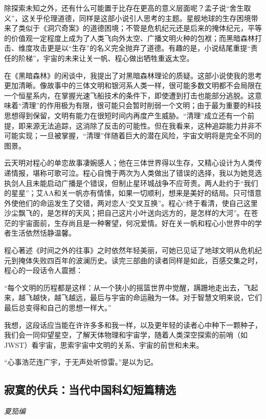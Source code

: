 \par 除探索未知之外，还有什么可能置于比存在更高的意义层面呢？孟子说“舍生取义”，这关乎伦理道德，同样是这部小说引人思考的主题。星舰地球的生存困境带来了类似于《洞穴奇案》的道德困境；不管是危机纪元还是后来的掩体纪元，平等的价值观一定程度上成为了人类飞向外太空、广播文明火种的包袱；而黑暗森林打击、维度攻击更是以“生存”的名义完全抛弃了道德。有趣的是，小说结尾重提“责任的阶梯”，宇宙的未来让关一帆、程心做出牺牲重返太空。
\par 在《黑暗森林》的闲谈中，我提出了对黑暗森林理论的质疑。这部小说使我的思考更加清晰。像故事中的三体文明和银河系人类一样，很可能多数文明都不会局限在一个恒星系内，在掌握光速飞船技术的条件下，即使遭到打击也能部分逃脱。这意味着“清理”的作用极为有限，很可能只会暂时削弱一个文明；由于最为重要的科技思想得到保留，文明有能力在很短时间内再度产生威胁。“清理”成立还有一个前提，即来源无法追踪，这消除了反击的可能性。但在我看来，这种追踪能力并非不可能实现；一旦被掌握，“清理”伴随着巨大的潜在风险，宇宙文明将是完全不同的图景。
\par 云天明对程心的单恋故事凄婉感人；他在三体世界得以生存，又精心设计为人类传递情报，堪称可歌可泣。程心自愧于两次为人类做出了错误的选择，我以为她竞选执剑人且未能启动广播是个错误，但制止星环城战争不应苛责。两人赴约于“我们的星星”；艾AA和关一帆亦有情愫，如果一切顺利，想来是美好的结局。只可惜意外使他们的命运发生了交错，两对恋人“交叉互换”。程心“终于看清，使自己这里沙尘飘飞的，是怎样的天风；把自己这片小叶送向远方的，是怎样的大河”。在苍茫的宇宙面前，生存尚且是一种奢望，何况爱情。好在关一帆和程心小世界中的学者生活依然恬静温馨。
\par 程心著述《时间之外的往事》之时依然年轻美丽，可她已见证了地球文明从危机纪元到掩体失败四百年的波澜历史。读完三部曲的读者同样是如此，百感交集之时，程心的一段话令人震撼：
\par “每个文明的历程都是这样：从一个狭小的摇篮世界中觉醒，蹒跚地走出去，飞起来，越飞越快，越飞越远，最后与宇宙的命运融为一体。对于智慧文明来说，它们最后总变得和自己的思想一样大。”
\par 我想，这段话应当能在许许多多和我一样，以及更年轻的读者心中种下一颗种子，我们会一同仰望星空，了解天体物理和宇宙学，随着人类深空探索的前哨（如JWST）看宇宙，思索宇宙中文明的关系、宇宙的前世和未来。
\par “心事浩茫连广宇，于无声处听惊雷。”是以为记。
\par {}

\subsection*{寂寞的伏兵：当代中国科幻短篇精选}
\par \emph{夏笳编} 

